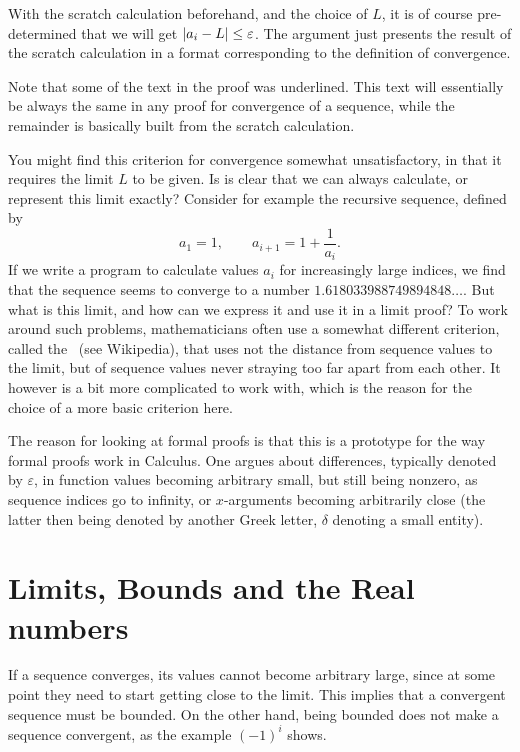 With the scratch calculation beforehand, and the choice of $L$, it is of
course pre-determined that we will get $\left|a_i-L\right|\le\varepsilon$. The
argument just presents the result of the scratch calculation in a format
corresponding to the definition of convergence.

Note that some of the text in the proof was underlined. This text will
essentially be always the same in any proof for convergence of a sequence,
while the remainder is basically built from the scratch calculation.

\begin{note}
\label{cauchycrit}
You might find this criterion for convergence somewhat unsatisfactory, in
that it requires the limit $L$ to be given. Is is clear that we can always
calculate, or represent this limit exactly? Consider for example the
recursive sequence, defined by
\[
a_1=1,\qquad a_{i+1}=1+\frac{1}{a_i}.
\]
If we write a program to calculate values $a_i$ for increasingly large
indices, we find that the sequence seems to converge to a number
$1.618033988749894848\ldots$. But what is this limit, and how can we express it and use it in a limit proof?  To work
around such problems, mathematicians often use a somewhat different
criterion, called the~ (see Wikipedia), that uses
not the distance from sequence values to the limit, but of sequence values
never straying too far apart from each other. It however is a bit more
complicated to work with, which is the reason for the choice of a more basic
criterion here.
\end{note}

The reason for looking at formal proofs is that this is a prototype for the
way formal proofs work in Calculus. One argues about differences, typically denoted
by $\varepsilon$, in function values becoming arbitrary small, but still
being nonzero, as sequence indices go to infinity, or $x$-arguments becoming
arbitrarily close (the latter then being denoted by another Greek letter, 
$\delta$ denoting a small entity).

\section{Limits, Bounds and the Real numbers}

If a sequence converges, its values cannot become arbitrary large, since at some point
they need to start getting close to the limit. This implies that a convergent sequence
must be bounded.
On the other hand, being bounded does not make a sequence
convergent, as the example $(-1)^i$ shows.

